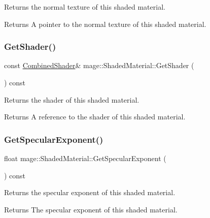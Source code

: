 Returns the normal texture of this shaded material.

\begin{DoxyReturn}{Returns}
A pointer to the normal texture of this shaded material. 
\end{DoxyReturn}
\hypertarget{structmage_1_1_shaded_material_a1d1affd63d0a2dd8543a10600a267e0b}{}\label{structmage_1_1_shaded_material_a1d1affd63d0a2dd8543a10600a267e0b} 
\subsubsection{\texorpdfstring{Get\+Shader()}{GetShader()}}
{\footnotesize\ttfamily const \hyperlink{structmage_1_1_combined_shader}{Combined\+Shader}\& mage\+::\+Shaded\+Material\+::\+Get\+Shader (\begin{DoxyParamCaption}{ }\end{DoxyParamCaption}) const\hspace{0.3cm}{\ttfamily [noexcept]}}

Returns the shader of this shaded material.

\begin{DoxyReturn}{Returns}
A reference to the shader of this shaded material. 
\end{DoxyReturn}
\hypertarget{structmage_1_1_shaded_material_adb859615bf3461e9554e91550860d588}{}\label{structmage_1_1_shaded_material_adb859615bf3461e9554e91550860d588} 
\subsubsection{\texorpdfstring{Get\+Specular\+Exponent()}{GetSpecularExponent()}}
{\footnotesize\ttfamily float mage\+::\+Shaded\+Material\+::\+Get\+Specular\+Exponent (\begin{DoxyParamCaption}{ }\end{DoxyParamCaption}) const\hspace{0.3cm}{\ttfamily [noexcept]}}

Returns the specular exponent of this shaded material.

\begin{DoxyReturn}{Returns}
The specular exponent of this shaded material. 
\end{DoxyReturn}
\hypertarget{structmage_1_1_shaded_material_abae39d873aab545a59d1b611cf9b2025}{}\label{structmage_1_1_shaded_material_abae39d873aab545a59d1b611cf9b2025} 
